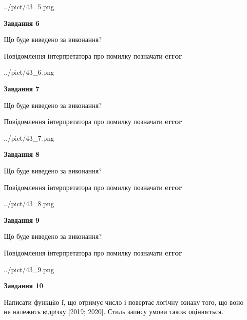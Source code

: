 \documentclass[12pt, ukrainian]{article}
\begin{document}
{\begin {large}
\begin{center}
	{../pict/43_5.png}
\end{center}
\newpage

{\begin {center}\textbf{Завдання 6}\end {center}}\par
Що буде виведено за виконання? \par
Повідомлення інтерпретатора про помилку позначати \textbf{error}

\begin{center}
	{../pict/43_6.png}
\end{center}
\newpage

{\begin {center}\textbf{Завдання 7}\end {center}}\par
Що буде виведено за виконання? \par
Повідомлення інтерпретатора про помилку позначати \textbf{error}

\begin{center}
	{../pict/43_7.png}
\end{center}
\newpage

{\begin {center}\textbf{Завдання 8}\end {center}}\par
Що буде виведено за виконання? \par
Повідомлення інтерпретатора про помилку позначати \textbf{error}

\begin{center}
	{../pict/43_8.png}
\end{center}
\newpage

{\begin {center}\textbf{Завдання 9}\end {center}}\par
Що буде виведено за виконання? \par
Повідомлення інтерпретатора про помилку позначати \textbf{error}

\begin{center}
	{../pict/43_9.png}
\end{center}
\newpage

{\begin {center}\textbf{Завдання 10}\end {center}}\par

Написати функцiю f, що отримує число і повертає логічну ознаку того, що воно не належить вiдрiзку [2019; 2020]. Стиль запису умови також оцінюється.\par
\newpage

\end {large}}
\end{document}
